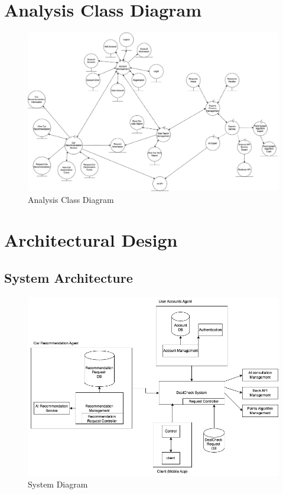 \documentclass[]{article}
\begin{document}


\pagebreak

\section{Analysis Class Diagram}
\label{sec:analysis_class_diagram}
\begin{figure}[H]
  \centering
  \includegraphics[scale=0.35]{3A04_acd.png}
  \caption{Analysis Class Diagram}\label{Fig:2.1}
\end{figure}

\pagebreak

\section{Architectural Design}
\label{sec:architectural_design}

\subsection{System Architecture}

\begin{figure}[H]
  \centering
  \includegraphics[scale=0.45]{3A04_sys2.png}
  \caption{System Diagram}\label{Fig:2.1}
\end{figure}
\end{document}
